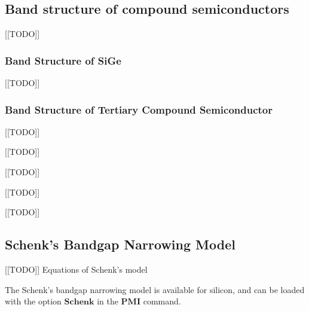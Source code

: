 \subsection{Band structure of compound semiconductors}
[[TODO]]
\par
\subsubsection{Band Structure of SiGe}
[[TODO]]
\par
\subsubsection{Band Structure of Tertiary Compound Semiconductor}
[[TODO]]
\par
{}[[TODO]]
\par
\par
{}[[TODO]]
\par
\par
{}[[TODO]]
\par
\par
{}[[TODO]]
\par
\par
\subsection{Schenk's Bandgap Narrowing Model}
[[TODO]] Equations of Schenk's model
\par
The Schenk's bandgap narrowing model is available for silicon, and can be loaded with the option
$\mathbf{Schenk}$ in the $\mathbf{PMI}$ command.
\par
